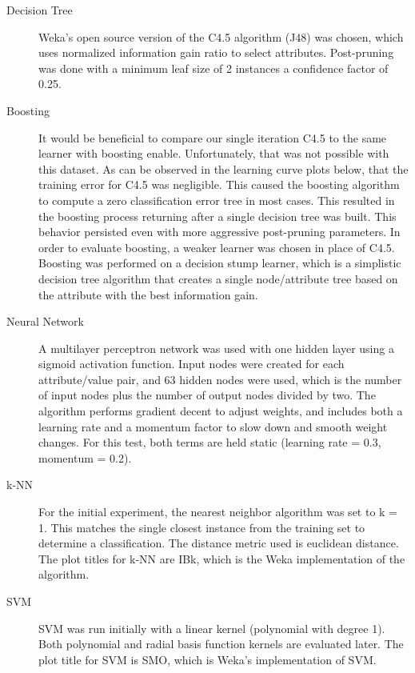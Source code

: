 \documentclass{sig-alternate}
\begin{document}
\begin{description}
    \item[Decision Tree] Weka's open source version of the C4.5 algorithm (J48) was chosen, which uses normalized information gain ratio to select attributes. Post-pruning was done with a minimum leaf size of 2 instances a confidence factor of 0.25.
    \item[Boosting] It would be beneficial to compare our single iteration C4.5 to the same learner with boosting enable. Unfortunately, that was not possible with this dataset. As can be observed in the learning curve plots below, that the training error for C4.5 was negligible. This caused the boosting algorithm to compute a zero classification error tree in most cases. This resulted in the boosting process returning after a single decision tree was built. This behavior persisted even with more aggressive post-pruning parameters. In order to evaluate boosting, a weaker learner was chosen in place of C4.5. Boosting was performed on a decision stump learner, which is a simplistic decision tree algorithm that creates a single node/attribute tree based on the attribute with the best information gain.
    \item[Neural Network] A multilayer perceptron network was used with one hidden layer using a sigmoid activation function. Input nodes were created for each attribute/value pair, and 63 hidden nodes were used, which is the number of input nodes plus the number of output nodes divided by two. The algorithm performs gradient decent to adjust weights, and includes both a learning rate and a momentum factor to slow down and smooth weight changes. For this test, both terms are held static (learning rate = 0.3, momentum = 0.2).
    \item[k-NN] For the initial experiment, the nearest neighbor algorithm was set to k = 1. This matches the single closest instance from the training set to determine a classification. The distance metric used is euclidean distance. The plot titles for k-NN are IBk, which is the Weka implementation of the algorithm. 
    \item[SVM] SVM was run initially with a linear kernel (polynomial with degree 1). Both polynomial and radial basis function kernels are evaluated later. The plot title for SVM is SMO, which is Weka's implementation of SVM.
\end{description}
\end{document}
